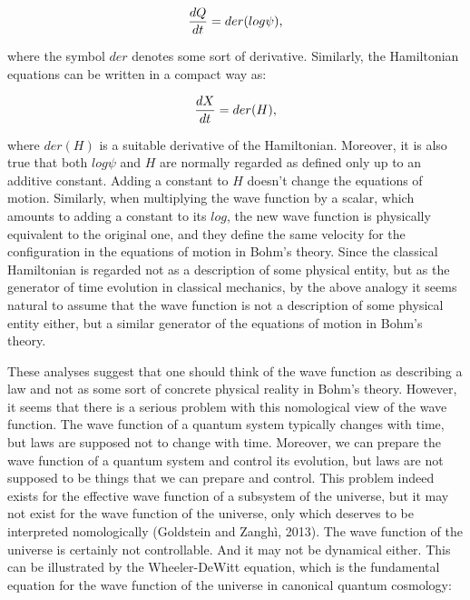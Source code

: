 \begin{equation}
{{dQ} \over {dt}}=der(log\psi),
\label{GE1}
\end{equation}

\noindent where the symbol $der$ denotes some sort of derivative. Similarly, the Hamiltonian equations can be written in a compact way as:

\begin{equation}
{{dX} \over {dt}}=der (H),
\label{HE}
\end{equation}

\noindent  where $der (H)$ is a suitable derivative of the Hamiltonian. Moreover, it is also true that both $log \psi$ and $H$ are normally regarded as defined only up to an additive constant. Adding a constant to $H$ doesn't change the equations of motion. Similarly, when multiplying the wave function by a scalar, which amounts to adding a constant to its $log$, the new wave function is physically equivalent to the original one, and they define the same velocity for the configuration in the equations of motion in Bohm's theory.
Since the classical Hamiltonian is regarded not as a description of some physical entity, but as the generator of time evolution in classical mechanics, by the above analogy it seems natural to assume that the wave function is not a description of some physical entity either, but a similar generator of the equations of motion in Bohm's theory.

These analyses suggest that one should think of the wave function as describing a law and not as some sort of concrete physical reality in Bohm's theory. However, it seems that there is a serious problem with this nomological view of the wave function. The wave function of a quantum system typically changes with time, but laws are supposed not to change with time. Moreover, we can prepare the wave function of a quantum system and control its evolution, but laws are not supposed to be things that we can prepare and control. 
This problem indeed exists for the effective wave function of a subsystem of the universe, but it may not exist for the wave function of the universe, only which deserves to be interpreted nomologically (Goldstein and Zangh\`{i}, 2013). The wave function of the universe is certainly not controllable. And it may not be dynamical either. This can be illustrated by the Wheeler-DeWitt equation, which is the fundamental equation for the wave function of the universe in canonical quantum cosmology:

